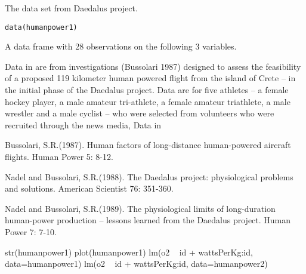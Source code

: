 \begin{Description}\relax
The data set from Daedalus project.
\end{Description}
\begin{Usage}
\begin{verbatim}data(humanpower1)\end{verbatim}
\end{Usage}
\begin{Format}\relax
A data frame with 28 observations on the following 3 variables.
\end{Format}
\begin{Details}\relax
Data in  are from investigations (Bussolari 1987)
designed to assess the feasibility of a proposed 119 kilometer human
powered flight from the island of Crete -- in the initial phase of the
Daedalus project.  Data are for five athletes
-- a female hockey player, a male amateur tri-athlete, a female
amateur triathlete, a male wrestler and a male cyclist -- who were
selected from volunteers who were recruited through the news media,
Data in 
\end{Details}
\begin{Source}\relax
Bussolari, S.R.(1987). Human factors of long-distance human-powered
aircraft flights.  Human Power 5: 8-12.

Nadel and Bussolari, S.R.(1988). The Daedalus project: physiological
problems and solutions.  American Scientist 76: 351-360.
\end{Source}
\begin{References}\relax
Nadel and Bussolari, S.R.(1989). The physiological limits of
long-duration human-power production -- lessons learned from
the Daedalus project.  Human Power 7: 7-10.
\end{References}
\begin{Examples}
\begin{ExampleCode}
str(humanpower1)
plot(humanpower1)
lm(o2 ~ id + wattsPerKg:id, data=humanpower1)
lm(o2 ~ id + wattsPerKg:id, data=humanpower2)
\end{ExampleCode}
\end{Examples}

